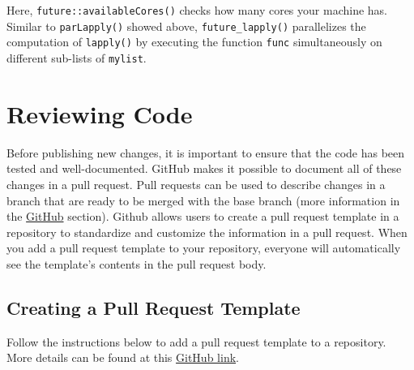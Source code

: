 \documentclass[
]{book}
\begin{document}
Here, \texttt{future::availableCores()} checks how many cores your machine has. Similar to \texttt{parLapply()} showed above, \texttt{future\_lapply()} parallelizes the computation of \texttt{lapply()} by executing the function \texttt{func} simultaneously on different sub-lists of \texttt{mylist}.

\section{Reviewing Code}\label{reviewing-code}

Before publishing new changes, it is important to ensure that the code has been tested and well-documented. GitHub makes it possible to document all of these changes in a pull request. Pull requests can be used to describe changes in a branch that are ready to be merged with the base branch (more information in the \hyperref[Github]{GitHub} section). Github allows users to create a pull request template in a repository to standardize and customize the information in a pull request. When you add a pull request template to your repository, everyone will automatically see the template's contents in the pull request body.

\subsection{Creating a Pull Request Template}\label{creating-a-pull-request-template}

Follow the instructions below to add a pull request template to a repository. More details can be found at this \href{https://help.github.com/en/github/building-a-strong-community/creating-a-pull-request-template-for-your-repository}{GitHub link}.
\end{document}

